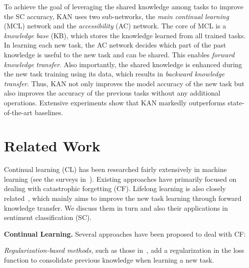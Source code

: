 \documentclass[runningheads]{llncs}
\begin{document}
To achieve the goal of leveraging the shared knowledge among tasks to improve the SC accuracy, KAN uses two sub-networks, the \textit{main continual learning} (MCL) network and the \textit{accessibility} (AC) network. The core of MCL is a \textit{knowledge base} (KB), which stores the knowledge learned from all trained tasks. In learning each new task, the AC network decides which part of the past knowledge is useful to the new task and can be shared. This enables \textit{forward knowledge transfer}. Also importantly, the shared knowledge is enhanced during the new task training using its data, which results in \textit{backward knowledge transfer}. Thus, KAN not only improves the model accuracy of the new task but also improves the accuracy of the previous tasks without any additional operations. Extensive experiments show that KAN markedly outperforms state-of-the-art baselines. 























\section{Related Work}
\label{sec:related}

Continual learning (CL) has been researched fairly extensively in machine learning (see the surveys in~\cite{chen2018lifelong,Parisi2019continual}). Existing approaches have primarily focused on dealing with catastrophic forgetting (CF). Lifelong learning is also closely related~\cite{Silver2013,ruvolo2013ella,chen2014topic,chen2018lifelong}, which mainly aims to improve the new task learning through forward knowledge transfer. We discuss them in turn and also their applications in sentiment classification (SC). 


\vspace{2mm}
\noindent
\textbf{Continual Learning.} Several approaches have been proposed to deal with CF: 





\textit{Regularization-based methods,} such as those in~\cite{Kirkpatrick2017overcoming,DBLP:conf/nips/LeeKJHZ17,Seff2017continual}, add a regularization in the loss function to consolidate previous knowledge when learning a new task. 
\end{document}
